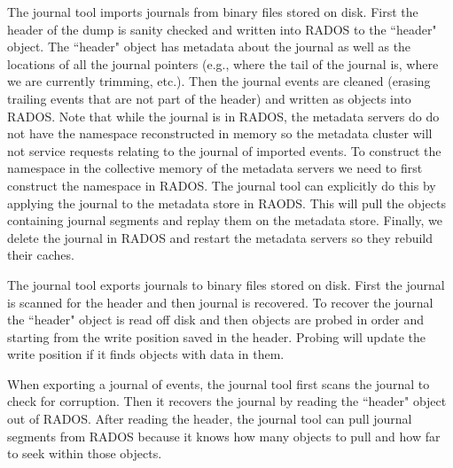 The journal tool imports journals from binary files stored on disk.  First the
header of the dump is sanity checked and written into RADOS to the ``header"
object.  The ``header" object has metadata about the journal as well as the
locations of all the journal pointers (e.g., where the tail of the journal is,
where we are currently trimming, etc.).  Then the journal events are cleaned
(erasing trailing events that are not part of the header) and written as
objects into RADOS.  Note that while the journal is in RADOS, the metadata
servers do do not have the namespace reconstructed in memory so the metadata
cluster will not service requests relating to the journal of imported events.
To construct the namespace in the collective memory of the metadata servers we
need to first construct the namespace in RADOS. The journal tool can explicitly
do this by  applying the journal to the metadata store in RAODS. This will pull
the objects containing journal segments and replay them on the metadata store.
Finally, we delete the journal in RADOS and restart the metadata servers so
they rebuild their caches.

The journal tool exports journals to binary files stored on disk. First the
journal is scanned for the header and then journal is recovered. To recover the
journal the ``header" object is read off disk and then objects are probed in
order and starting from the write position saved in the header. Probing will
update the write position if it finds objects with data in them. 

When exporting a journal of events, the journal tool first scans the journal to
check for corruption. Then it recovers the journal by reading the ``header"
object out of RADOS.  After reading the header, the journal tool can pull
journal segments from RADOS because it knows how many objects to pull and how
far to seek within those objects.

%



